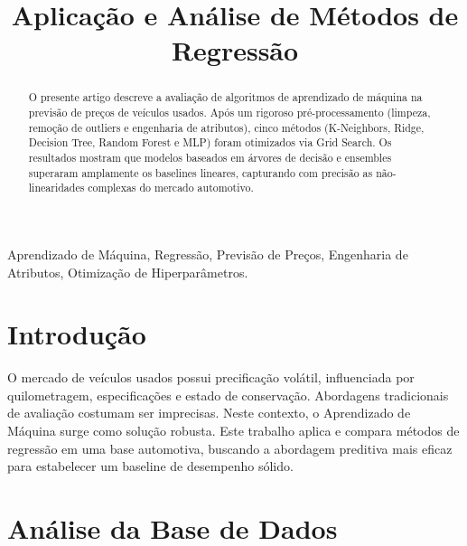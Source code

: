 \documentclass[conference]{IEEEtran}
\begin{document}
	\title{Aplicação e Análise de Métodos de Regressão}

	\author{
	}

	\maketitle

	\begin{abstract}

		O presente artigo descreve a avaliação de algoritmos de aprendizado de máquina na previsão de preços de veículos usados. Após um rigoroso pré-processamento (limpeza, remoção de outliers e engenharia de atributos), cinco métodos (K-Neighbors, Ridge, Decision Tree, Random Forest e MLP) foram otimizados via Grid Search. Os resultados mostram que modelos baseados em árvores de decisão e ensembles superaram amplamente os baselines lineares, capturando com precisão as não-linearidades complexas do mercado automotivo.

	\end{abstract}

	\begin{IEEEkeywords}

		Aprendizado de Máquina, Regressão, Previsão de Preços, Engenharia de Atributos, Otimização de Hiperparâmetros.

	\end{IEEEkeywords}

	\section{Introdução}

		O mercado de veículos usados possui precificação volátil, influenciada por quilometragem, especificações e estado de conservação. Abordagens tradicionais de avaliação costumam ser imprecisas. Neste contexto, o Aprendizado de Máquina surge como solução robusta. Este trabalho aplica e compara métodos de regressão em uma base automotiva, buscando a abordagem preditiva mais eficaz para estabelecer um baseline de desempenho sólido.

	\section{Análise da Base de Dados}
\end{document}
